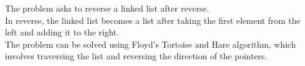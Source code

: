\documentclass[preview]{standalone}
\begin{document}
The problem asks to reverse a linked list after reverse.\\In reverse, the linked list becomes a list after taking the first element from the left and adding it to the right.\\The problem can be solved using Floyd’s Tortoise and Hare algorithm, which involves traversing the list and reversing the direction of the pointers.\\
\end{document}
